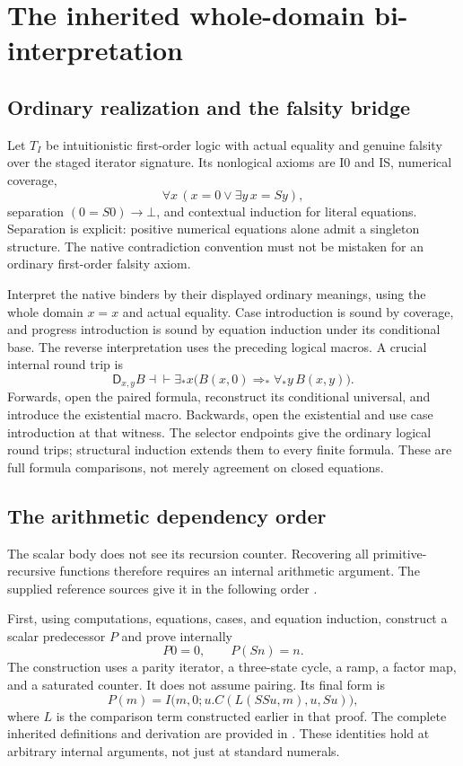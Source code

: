 \documentclass[11pt,letterpaper]{article}
\theoremstyle{definition}
\newcommand{\D}{\mathsf D}
\newcommand{\TI}{T_I}
\newcommand{\file}[1]{\texttt{\detokenize{#1}}}
\begin{document}
\section{The inherited whole-domain bi-interpretation}
\subsection{Ordinary realization and the falsity bridge}
Let $\TI$ be intuitionistic first-order logic with actual equality and
genuine falsity over the staged iterator signature. Its nonlogical
axioms are I0 and IS, numerical coverage,
\[
 \forall x\,(x=0\vee\exists y\,x=Sy),
\]
separation $(0=S0)\to\bot$, and contextual induction for literal equations.
Separation is explicit: positive numerical equations alone admit a
singleton structure. The native contradiction convention must not be
mistaken for an ordinary first-order falsity axiom.

Interpret the native binders by their displayed ordinary meanings, using
the whole domain $x=x$ and actual equality. Case introduction is sound by
coverage, and progress introduction is sound by equation induction under
its conditional base. The reverse interpretation uses the preceding
logical macros. A crucial internal round trip is
\[
 \D_{x,y}B\dashv\vdash
 \exists_*x\bigl(B(x,0)\Rightarrow_*\forall_*y\,B(x,y)\bigr).
\]
Forwards, open the paired formula, reconstruct its conditional universal,
and introduce the existential macro. Backwards, open the existential and
use case introduction at that witness. The selector endpoints give the
ordinary logical round trips; structural induction extends them to every
finite formula. These are full formula comparisons, not merely agreement
on closed equations.

\subsection{The arithmetic dependency order}
The scalar body does not see its recursion counter. Recovering all
primitive-recursive functions therefore requires an internal arithmetic
argument. The supplied reference sources give it in the following order
\cite{bridge,predecessor,reflection,recursion}.

First, using computations, equations, cases, and equation induction,
construct a scalar predecessor $P$ and prove internally
\[
 P0=0,\qquad P(Sn)=n.
\]
The construction uses a parity iterator, a three-state cycle, a ramp, a
factor map, and a saturated counter. It does not assume pairing. Its final
form is
\[
 P(m)=I\bigl(m,0;u.C(L(SSu,m),u,Su)\bigr),
\]
where $L$ is the comparison term constructed earlier in that proof.
The complete inherited definitions and derivation are provided in
\file{reference/foundations/scalar_predecessor.tex}. These identities hold
at arbitrary internal arguments, not just at standard numerals.
\end{document}
